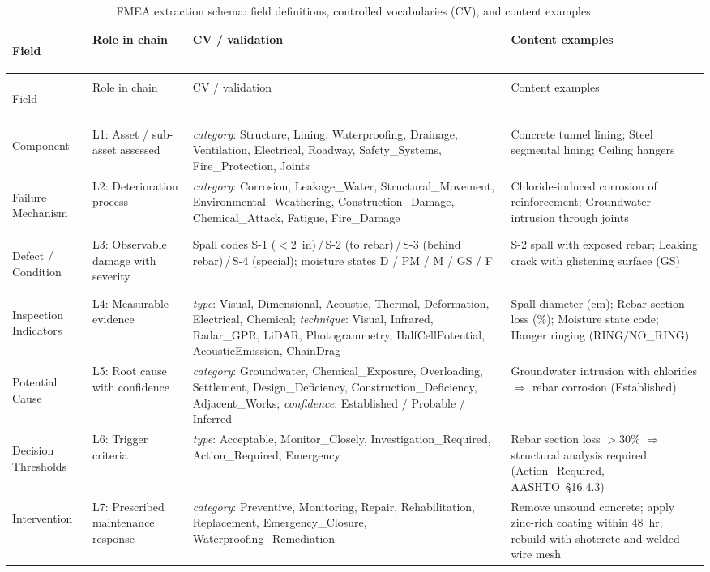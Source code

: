 \documentclass[11pt,a4paper]{article}
\begin{document}
\begin{longtable}{
>{\bfseries\raggedright\arraybackslash}p{2.0cm}
>{\raggedright\arraybackslash}p{2.0cm}
>{\raggedright\arraybackslash}p{6cm}
>{\raggedright\arraybackslash}p{4.5cm}
}
\caption{FMEA extraction schema: field definitions, controlled vocabularies (CV), and content examples.}
\label{tab:schema}\\
\toprule
Field & Role in chain & CV / validation & Content examples \\
\midrule
\endfirsthead
\multicolumn{4}{c}{\tablename~\thetable{} (continued)}\\
\toprule
Field & Role in chain & CV / validation & Content examples \\
\midrule
\endhead
\midrule
\multicolumn{4}{r}{\textit{continued\ldots}}\\
\endfoot
\bottomrule
\endlastfoot
Component & L1: Asset / sub-asset assessed &
  \textit{category}: Structure, Lining, Waterproofing, Drainage,
  Ventilation, Electrical, Roadway, Safety\_Systems, Fire\_Protection,
  Joints &
  Concrete tunnel lining; Steel segmental lining; Ceiling hangers
  \\[3pt]
Failure Mechanism & L2: Deterioration process &
  \textit{category}: Corrosion, Leakage\_Water, Structural\_Movement,
  Environmental\_Weathering, Construction\_Damage, Chemical\_Attack,
  Fatigue, Fire\_Damage &
  Chloride-induced corrosion of reinforcement; Groundwater intrusion
  through joints \\[3pt]
Defect / Condition & L3: Observable damage with severity &
  Spall codes S-1 ($<2$~in)\,/\,S-2 (to rebar)\,/\,S-3 (behind rebar)\,/\,S-4
  (special); moisture states D / PM / M / GS / F &
  S-2 spall with exposed rebar; Leaking crack with glistening surface
  (GS) \\[3pt]
Inspection Indicators & L4: Measurable evidence &
  \textit{type}: Visual, Dimensional, Acoustic, Thermal, Deformation,
  Electrical, Chemical;
  \textit{technique}: Visual, Infrared, Radar\_GPR, LiDAR,
  Photogrammetry, HalfCellPotential, AcousticEmission, ChainDrag &
  Spall diameter (cm); Rebar section loss (\%);
  Moisture state code; Hanger ringing (RING/NO\_RING) \\[3pt]
Potential Cause & L5: Root cause with confidence &
  \textit{category}: Groundwater, Chemical\_Exposure, Overloading,
  Settlement, Design\_Deficiency, Construction\_Deficiency, Adjacent\_Works;
  \textit{confidence}: Established / Probable / Inferred &
  Groundwater intrusion with chlorides $\Rightarrow$ rebar corrosion
  (Established) \\[3pt]
Decision Thresholds & L6: Trigger criteria &
  \textit{type}: Acceptable, Monitor\_Closely, Investigation\_Required,
  Action\_Required, Emergency &
  Rebar section loss $>30\%$ $\Rightarrow$ structural analysis required
  (Action\_Required, AASHTO~\S16.4.3) \\[3pt]
Intervention & L7: Prescribed maintenance response &
  \textit{category}: Preventive, Monitoring, Repair, Rehabilitation,
  Replacement, Emergency\_Closure, Waterproofing\_Remediation &
  Remove unsound concrete; apply zinc-rich coating within 48~hr;
  rebuild with shotcrete and welded wire mesh \\
\end{longtable}
\end{document}
